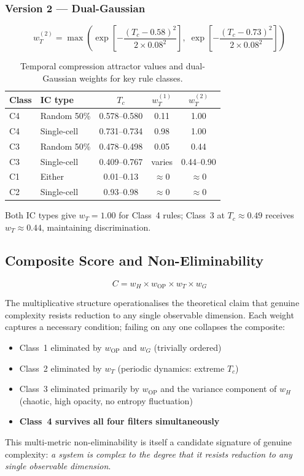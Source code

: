 \documentclass[12pt,a4paper]{article}
\begin{document}
\subsubsection*{Version 2 --- Dual-Gaussian}

\begin{equation}
w_T^{(2)} = \max\!\left(
  \exp\!\left[-\frac{(T_c - 0.58)^2}{2 \times 0.08^2}\right],\;
  \exp\!\left[-\frac{(T_c - 0.73)^2}{2 \times 0.08^2}\right]
\right)
\end{equation}

\begin{table}[h]
\centering
\small
\caption{Temporal compression attractor values and dual-Gaussian weights
for key rule classes.}
\begin{tabular}{llccc}
\toprule
Class & IC type & $T_c$ & $w_T^{(1)}$ & $w_T^{(2)}$ \\
\midrule
C4 & Random 50\%   & 0.578--0.580 & 0.11 & 1.00 \\
C4 & Single-cell   & 0.731--0.734 & 0.98 & 1.00 \\
C3 & Random 50\%   & 0.478--0.498 & 0.05 & 0.44 \\
C3 & Single-cell   & 0.409--0.767 & varies & 0.44--0.90 \\
C1 & Either        & 0.01--0.13   & $\approx 0$ & $\approx 0$ \\
C2 & Single-cell   & 0.93--0.98   & $\approx 0$ & $\approx 0$ \\
\bottomrule
\end{tabular}
\end{table}

Both IC types give $w_T = 1.00$ for Class~4 rules;
Class~3 at $T_c \approx 0.49$ receives $w_T \approx 0.44$, maintaining
discrimination.

\subsection{Composite Score and Non-Eliminability}

\begin{equation}
C = w_H \times w_\text{OP} \times w_T \times w_G
\end{equation}

The multiplicative structure operationalises the theoretical claim that
genuine complexity resists reduction to any single observable dimension.
Each weight captures a necessary condition; failing on any one collapses
the composite:
\begin{itemize}[noitemsep]
  \item Class~1 eliminated by $w_\text{OP}$ and $w_G$ (trivially ordered)
  \item Class~2 eliminated by $w_T$ (periodic dynamics: extreme $T_c$)
  \item Class~3 eliminated primarily by $w_\text{OP}$ and the variance
    component of $w_H$ (chaotic, high opacity, no entropy fluctuation)
  \item \textbf{Class~4 survives all four filters simultaneously}
\end{itemize}
This multi-metric non-eliminability is itself a candidate signature of
genuine complexity: \emph{a system is complex to the degree that it
resists reduction to any single observable dimension}.
\end{document}
